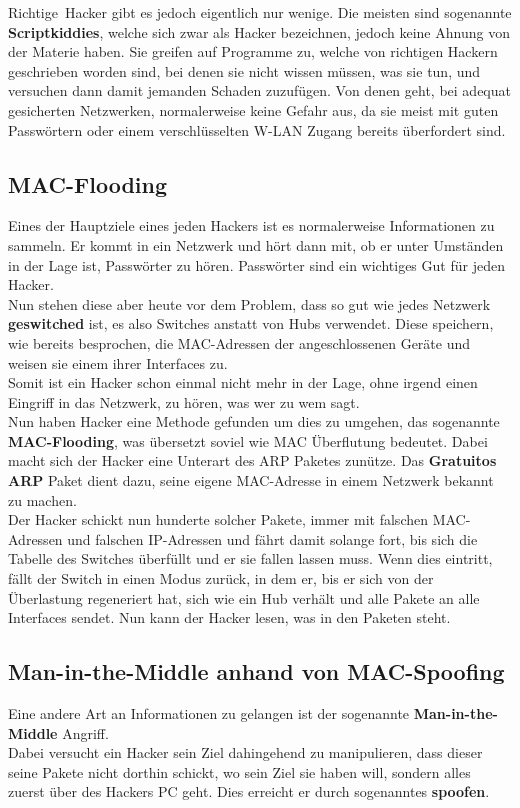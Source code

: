 \documentclass[12pt,a4paper]{report}
\begin{document}
\begin{onehalfspace}
\glqq Richtige\grqq \ Hacker gibt es jedoch eigentlich nur wenige. Die meisten sind sogenannte \textbf{Scriptkiddies}, welche sich zwar als Hacker bezeichnen, jedoch keine Ahnung von der Materie haben. Sie greifen auf Programme zu, welche von richtigen Hackern geschrieben worden sind, bei denen sie nicht wissen müssen, was sie tun, und versuchen dann damit jemanden Schaden zuzufügen. Von denen geht, bei adequat gesicherten Netzwerken, normalerweise keine Gefahr aus, da sie meist mit guten Passwörtern oder einem verschlüsselten W-LAN Zugang bereits überfordert sind.

\subsection{MAC-Flooding}\label{ssec:mflood}
Eines der Hauptziele eines jeden Hackers ist es normalerweise Informationen zu sammeln. Er kommt in ein Netzwerk und hört dann mit, ob er unter Umständen in der Lage ist, Passwörter zu hören. Passwörter sind ein wichtiges Gut für jeden Hacker.\\
Nun stehen diese aber heute vor dem Problem, dass so gut wie jedes Netzwerk \textbf{geswitched} ist, es also Switches anstatt von Hubs verwendet. Diese speichern, wie bereits besprochen, die MAC-Adressen der angeschlossenen Geräte und weisen sie einem ihrer Interfaces zu.\\
Somit ist ein Hacker schon einmal nicht mehr in der Lage, ohne irgend einen Eingriff in das Netzwerk, zu hören, was wer zu wem sagt.\\

Nun haben Hacker eine Methode gefunden um dies zu umgehen, das sogenannte \textbf{MAC-Flooding}, was übersetzt soviel wie MAC Überflutung bedeutet. Dabei macht sich der Hacker eine Unterart des ARP Paketes zunütze. Das \textbf{Gratuitos ARP} Paket dient dazu, seine eigene MAC-Adresse in einem Netzwerk bekannt zu machen.\\
Der Hacker schickt nun hunderte solcher Pakete, immer mit falschen MAC-Adressen und falschen IP-Adressen und fährt damit solange fort, bis sich die Tabelle des Switches überfüllt und er sie fallen lassen muss. Wenn dies eintritt, fällt der Switch in einen Modus zurück, in dem er, bis er sich von der Überlastung regeneriert hat, sich wie ein Hub verhält und alle Pakete an alle Interfaces sendet. Nun kann der Hacker lesen, was in den Paketen steht.\\

\subsection{Man-in-the-Middle anhand von MAC-Spoofing}\label{ssec:mspoof}
Eine andere Art an Informationen zu gelangen ist der sogenannte \textbf{Man-in-the-Middle} Angriff.\\
Dabei versucht ein Hacker sein Ziel dahingehend zu manipulieren, dass dieser seine Pakete nicht dorthin schickt, wo sein Ziel sie haben will, sondern alles zuerst über des Hackers PC geht. Dies erreicht er durch sogenanntes \textbf{spoofen}.\\


\end{onehalfspace}
\end{document}
